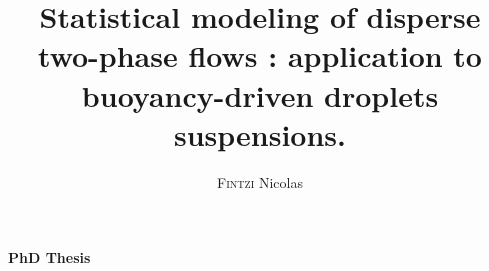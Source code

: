 \makeatletter
\begin{titlepage}

\begin{table}[h!]
\begin{minipage}[h]{0.5\linewidth}
\end{minipage}
\hspace{1cm}
\begin{minipage}[h]{0.5\linewidth}
\end{minipage}
\end{table}

\vfill

\begin{center}
{\Large\textbf{PhD Thesis}}\\

\vspace{3em}
\vspace{10pt}
\title{Statistical modeling of disperse two-phase flows : application to buoyancy-driven droplets suspensions.}
{\huge\textbf{\@title}} \\
\vspace{10pt}


\vspace{2em}
\author{\textsc{Fintzi} Nicolas}
{\LARGE \@author}

\vspace{3em}
{\large\textbf{\@date}}\\
\end{center}


\vfill


\vspace{1em}


\end{titlepage}
